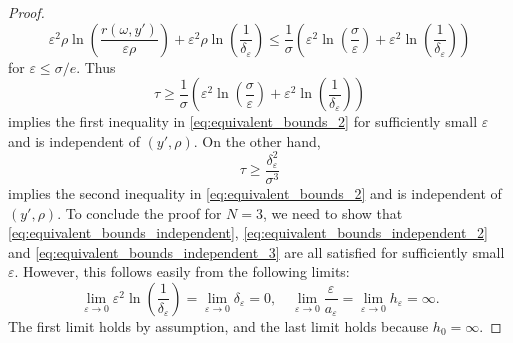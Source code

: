 \documentclass{article}
\numberwithin{equation}{section}
\theoremstyle{definition}
\theoremstyle{remark}
\begin{document}
\begin{proof}
    \[
    \varepsilon^2 \rho \ln\left(\frac{r(\omega, y')}{\varepsilon \rho}\right) + \varepsilon^2 \rho \ln\left(\frac{1}{\delta_\varepsilon}\right) \le \frac{1}{\sigma} \left(\varepsilon^2 \ln\left(\frac{\sigma}{\varepsilon}\right) + \varepsilon^2 \ln\left(\frac{1}{\delta_\varepsilon}\right)\right)
    \]
    for $\varepsilon \le \sigma/e$. Thus
    \begin{equation} \label{eq:equivalent_bounds_independent_2}
        \tau \ge \frac{1}{\sigma} \left(\varepsilon^2 \ln\left(\frac{\sigma}{\varepsilon}\right) + \varepsilon^2 \ln\left(\frac{1}{\delta_\varepsilon}\right)\right)
    \end{equation}
    implies the first inequality in \eqref{eq:equivalent_bounds_2} for sufficiently small $\varepsilon$ and is independent of $(y', \rho)$. On the other hand,
    \begin{equation} \label{eq:equivalent_bounds_independent_3}
        \tau \ge \frac{\delta_\varepsilon^2}{\sigma^3}
    \end{equation}
    implies the second inequality in \eqref{eq:equivalent_bounds_2} and is independent of $(y', \rho)$. To conclude the proof for $N = 3$, we need to show that \eqref{eq:equivalent_bounds_independent}, \eqref{eq:equivalent_bounds_independent_2} and \eqref{eq:equivalent_bounds_independent_3} are all satisfied for sufficiently small $\varepsilon$. However, this follows easily from the following limits:
    \[
    \lim_{\varepsilon \to 0} \varepsilon^2 \ln\left(\frac{1}{\delta_\varepsilon}\right) = \lim_{\varepsilon \to 0} \delta_\varepsilon = 0, \quad \lim_{\varepsilon \to 0} \frac{\varepsilon}{a_\varepsilon} = \lim_{\varepsilon \to 0} h_\varepsilon = \infty.
    \]
    The first limit holds by assumption, and the last limit holds because $h_0 = \infty$.


\end{proof}
\end{document}
